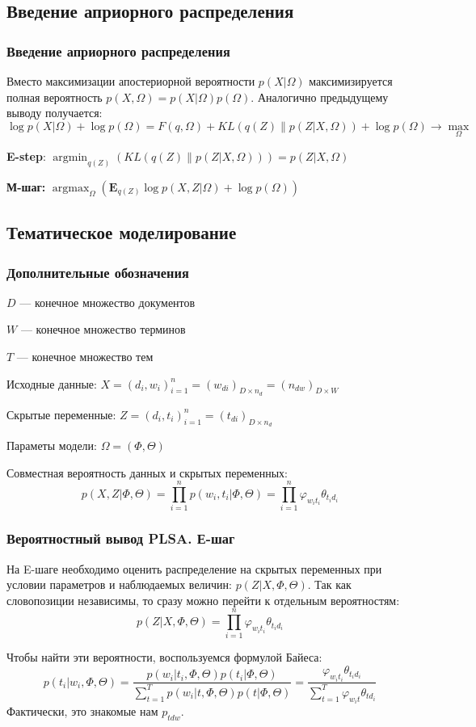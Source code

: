 \documentclass[utf8]{beamer}
\DeclareMathOperator{\argmax}{argmax}
\DeclareMathOperator{\argmin}{argmin}
\renewcommand{\phi}{\varphi}
\begin{document}
	\subsection{Введение априорного распределения}
	\begin{frame}	
	\frametitle{Введение априорного распределения}
	Вместо максимизации апостериорной вероятности $p(X|\Omega)$ максимизируется полная  вероятность $p(X, \Omega)= p(X|\Omega) p(\Omega)$. Аналогично предыдущему выводу получается:
\[
\log p(X|\Omega) + \log p(\Omega) = F(q, \Omega) + KL(q(Z)\|p(Z|X,\Omega)) + \log p(\Omega) \to \max\limits_{\Omega}
\]

\textbf{E-step}: $\argmin_{q(Z)} \left( KL(q(Z)\|p(Z|X,\Omega))\right) = p(Z|X, \Omega)$

\medskip

\textbf{М-шаг:} $\argmax_{\Omega} \left( \mathbf{E}_{q(Z)} \log p(X, Z|\Omega) + \log p(\Omega)\right)$ 
	\end{frame}


	\subsection{Тематическое моделирование}

 	\begin{frame}
		\frametitle{Дополнительные обозначения}  
$D$ --- конечное множество документов
\smallskip

$W$  --- конечное множество терминов
\smallskip

$T$ --- конечное множество тем
\smallskip

Исходные данные:
$X = (d_i ,w_i)_{i=1}^n = (w_{di})_{D \times n_d} = (n_{dw})_{D \times W}$
\smallskip

Скрытые переменные:
$Z = (d_i , t_i)_{i=1}^n = (t_{di})_{D \times n_d}$
\smallskip

Параметы модели:
$\Omega = (\Phi, \Theta)$
\smallskip

Совместная вероятность данных и скрытых переменных:
\[
p(X, Z|\Phi, \Theta) =\prod\limits_{i=1}^{n} p(w_{i}, t_{i}|\Phi, \Theta) =\prod\limits_{i=1}^{n} \phi_{w_{i}t_{i}}\theta_{t_{i}d_{i}}
\]
	\end{frame}

	
 	\begin{frame}
		\frametitle{Вероятностный вывод PLSA. Е-шаг}   
На E-шаге необходимо оценить распределение на скрытых переменных при условии параметров и  наблюдаемых величин: $p(Z|X,\Phi,\Theta)$. Так как словопозиции независимы, то сразу можно перейти к отдельным вероятностям:
\[
p(Z|X,\Phi, \Theta) = \prod\limits_{i=1}^{n} \phi_{w_{i}t_{i}}\theta_{t_{i}d_{i}}
\]

Чтобы найти эти вероятности, воспользуемся формулой Байеса:
\[
p(t_{i}|w_{i}, \Phi, \Theta) = \frac{p(w_{i}|t_{i}, \Phi, \Theta)p(t_{i}|\Phi,\Theta)}{\sum_{t=1}^T p(w_{i}|t, \Phi, \Theta)p(t|\Phi,\Theta)}
= \frac{\phi_{w_{i} t_{i}} \theta_{t_{i} d_i}}{\sum_{t=1}^T \phi_{w_{i}t} \theta_{td_i}}
\]
Фактически, это знакомые нам $p_{tdw}$.
	\end{frame}
	
\end{document}
